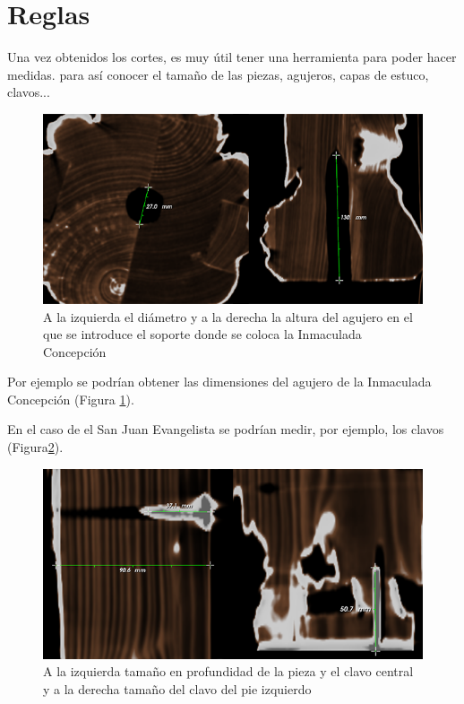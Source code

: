 \section{Reglas}

Una vez obtenidos los cortes, es muy útil tener una herramienta para poder hacer medidas. para así conocer el tamaño de las piezas, agujeros, capas de estuco, clavos...

\begin{figure}[H]
	\centering
	\includegraphics[width=12.5cm]{imagenes/medidas_inmaculada_concepcion_agujero}
	\caption{A la izquierda el diámetro y a la derecha la altura del agujero en el que se introduce el soporte donde se coloca la Inmaculada Concepción}
	\label{fig:medidas_inmaculada_concepcion_agujero}
\end{figure}

Por ejemplo se podrían obtener las dimensiones del agujero de la Inmaculada Concepción (Figura \ref{fig:medidas_inmaculada_concepcion_agujero}).

En el caso de el San Juan Evangelista se podrían medir, por ejemplo, los clavos (Figura\ref{fig:medidas_san_juan_evangelista_clavo}).

\begin{figure}[H]
	\centering
	\includegraphics[width=12.5cm]{imagenes/medidas_san_juan_evangelista_clavo}
	\caption{A la izquierda tamaño en profundidad de la pieza y el clavo central y a la derecha tamaño del clavo del pie izquierdo}
	\label{fig:medidas_san_juan_evangelista_clavo}
\end{figure}

